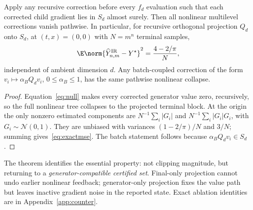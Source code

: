 \begin{theorem}
\label{thm:rescue}
Apply any recursive correction before every $f_d$ evaluation such that each corrected child gradient lies in $S_d$ almost surely. Then all nonlinear multilevel corrections vanish pathwise. In particular, for recursive orthogonal projection $Q_d$ onto $S_d$, at $(t,x)=(0,0)$ with $N=m^n$ terminal samples,
\begin{equation}
\E\norm{\widehat Y^{\rm IR}_{n,m}-Y^\star}^2
=\frac{4-2/\pi}{N},
\label{eq:exactmse}
\end{equation}
independent of ambient dimension $d$. Any batch-coupled correction of the form $v_i\mapsto\alpha_BQ_dv_i$, $0\le\alpha_B\le1$, has the same pathwise nonlinear collapse.
\end{theorem}
\begin{proof}
Equation~\eqref{eq:null} makes every corrected generator value zero, recursively, so the full nonlinear tree collapses to the projected terminal block. At the origin the only nonzero estimated components are
$N^{-1}\sum_i|G_i|$ and $N^{-1}\sum_i|G_i|G_i$, with $G_i\sim\mathcal N(0,1)$. They are unbiased with variances $(1-2/\pi)/N$ and $3/N$; summing gives~\eqref{eq:exactmse}. The batch statement follows because $\alpha_BQ_dv_i\in S_d$.
\end{proof}

The theorem identifies the essential property: not clipping magnitude, but returning to a \emph{generator-compatible certified set}. Final-only projection cannot undo earlier nonlinear feedback; generator-only projection fixes the value path but leaves inactive gradient noise in the reported state. Exact ablation identities are in Appendix~\ref{app:counter}.


